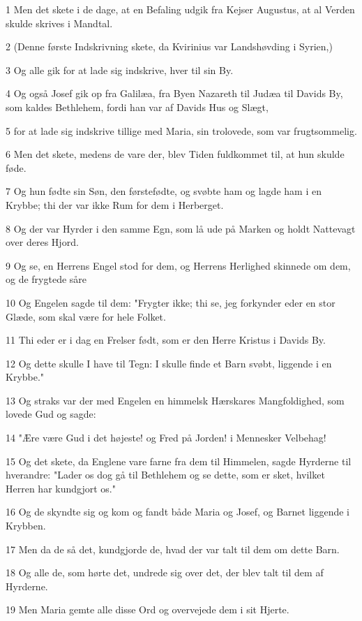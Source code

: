 \par 1 Men det skete i de dage, at en Befaling udgik fra Kejser Augustus, at al Verden skulde skrives i Mandtal.
\par 2 (Denne første Indskrivning skete, da Kvirinius var Landshøvding i Syrien,)
\par 3 Og alle gik for at lade sig indskrive, hver til sin By.
\par 4 Og også Josef gik op fra Galilæa, fra Byen Nazareth til Judæa til Davids By, som kaldes Bethlehem, fordi han var af Davids Hus og Slægt,
\par 5 for at lade sig indskrive tillige med Maria, sin trolovede, som var frugtsommelig.
\par 6 Men det skete, medens de vare der, blev Tiden fuldkommet til, at hun skulde føde.
\par 7 Og hun fødte sin Søn, den førstefødte, og svøbte ham og lagde ham i en Krybbe; thi der var ikke Rum for dem i Herberget.
\par 8 Og der var Hyrder i den samme Egn, som lå ude på Marken og holdt Nattevagt over deres Hjord.
\par 9 Og se, en Herrens Engel stod for dem, og Herrens Herlighed skinnede om dem, og de frygtede såre
\par 10 Og Engelen sagde til dem: "Frygter ikke; thi se, jeg forkynder eder en stor Glæde, som skal være for hele Folket.
\par 11 Thi eder er i dag en Frelser født, som er den Herre Kristus i Davids By.
\par 12 Og dette skulle I have til Tegn: I skulle finde et Barn svøbt, liggende i en Krybbe."
\par 13 Og straks var der med Engelen en himmelsk Hærskares Mangfoldighed, som lovede Gud og sagde:
\par 14 "Ære være Gud i det højeste! og Fred på Jorden! i Mennesker Velbehag!
\par 15 Og det skete, da Englene vare farne fra dem til Himmelen, sagde Hyrderne til hverandre: "Lader os dog gå til Bethlehem og se dette, som er sket, hvilket Herren har kundgjort os."
\par 16 Og de skyndte sig og kom og fandt både Maria og Josef, og Barnet liggende i Krybben.
\par 17 Men da de så det, kundgjorde de, hvad der var talt til dem om dette Barn.
\par 18 Og alle de, som hørte det, undrede sig over det, der blev talt til dem af Hyrderne.
\par 19 Men Maria gemte alle disse Ord og overvejede dem i sit Hjerte.
